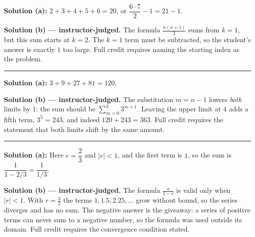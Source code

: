 \documentclass[12pt]{article}
\begin{document}




\textbf{Solution (a):} \quad $2 + 3 + 4 + 5 + 6 = 20$, or
$\dfrac{6 \cdot 7}{2} - 1 = 21 - 1$. 

\textbf{Solution (b) --- instructor-judged.} \quad The formula $\frac{n(n+1)}{2}$ sums from
$k = 1$, but this sum starts at $k = 2$. The $k = 1$ term must be subtracted, so the student's
answer is exactly $1$ too large. Full credit requires naming the starting index as the problem.

\vspace{0.15cm}\noindent\rule{\linewidth}{0.2pt}\vspace{0.15cm}


\textbf{Solution (a):} \quad $3 + 9 + 27 + 81 = 120$. 

\textbf{Solution (b) --- instructor-judged.} \quad The substitution $m = n - 1$ lowers
\emph{both} limits by $1$: the sum should be $\sum_{m=0}^{3} 3^{m+1}$. Leaving the upper limit
at $4$ adds a fifth term, $3^5 = 243$, and indeed $120 + 243 = 363$. Full credit requires the
statement that both limits shift by the same amount.

\vspace{0.15cm}\noindent\rule{\linewidth}{0.2pt}\vspace{0.15cm}


\textbf{Solution (a):} \quad Here $r = \dfrac{2}{3}$ and $|r| < 1$, and the first term is
$1$, so the sum is $\dfrac{1}{1 - 2/3} = \dfrac{1}{1/3}$. 

\textbf{Solution (b) --- instructor-judged.} \quad The formula $\frac{a}{1-r}$ is valid only
when $|r| < 1$. With $r = \frac{3}{2}$ the terms $1, 1.5, 2.25, \ldots$ grow without bound, so
the series diverges and has no sum. The negative answer is the giveaway: a series of positive
terms can never sum to a negative number, so the formula was used outside its domain. Full
credit requires the convergence condition stated.
\end{document}
